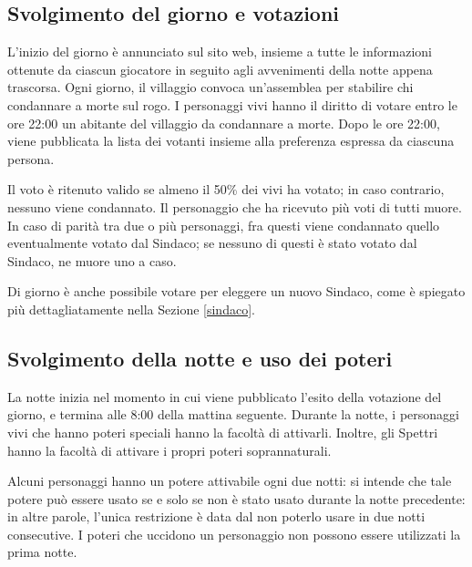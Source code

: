 \documentclass[a4paper,10pt]{article}
\begin{document}

\subsection{Svolgimento del giorno e votazioni}

L'inizio del giorno è annunciato sul sito web, insieme a tutte le informazioni ottenute da ciascun giocatore in seguito agli avvenimenti della notte appena trascorsa. Ogni giorno, il villaggio convoca un'assemblea per stabilire chi condannare a morte sul rogo. I personaggi vivi hanno il diritto di votare entro le ore 22:00 un abitante del villaggio da condannare a morte. Dopo le ore 22:00, viene pubblicata la lista dei votanti insieme alla preferenza espressa da ciascuna persona.

Il voto è ritenuto valido se almeno il 50\% dei vivi ha votato; in caso contrario, nessuno viene condannato. Il personaggio che ha ricevuto più voti di tutti muore. In caso di parità tra due o più personaggi, fra questi viene condannato quello eventualmente votato dal Sindaco; se nessuno di questi è stato votato dal Sindaco, ne muore uno a caso.

Di giorno è anche possibile votare per eleggere un nuovo Sindaco, come è spiegato più dettagliatamente nella Sezione \ref{sindaco}.

\subsection{Svolgimento della notte e uso dei poteri}

La notte inizia nel momento in cui viene pubblicato l'esito della votazione del giorno, e termina alle 8:00 della mattina seguente. Durante la notte, i personaggi vivi che hanno poteri speciali hanno la facoltà di attivarli. Inoltre, gli Spettri hanno la facoltà di attivare i propri poteri soprannaturali.

Alcuni personaggi hanno un potere attivabile ogni due notti: si intende che tale potere può essere usato se e solo se non è stato usato durante la notte precedente: in altre parole, l'unica restrizione è data dal non poterlo usare in due notti consecutive. I poteri che uccidono un personaggio non possono essere utilizzati la prima notte.
\end{document}
